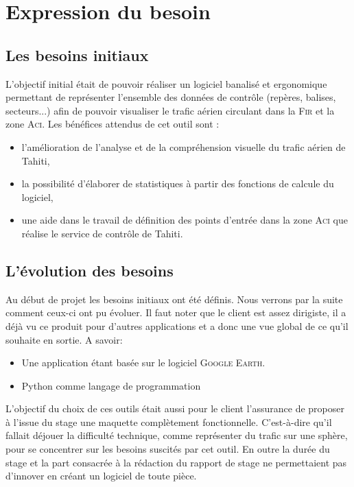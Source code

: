 
\section{Expression du besoin} 
    \subsection{Les besoins initiaux}
L’objectif initial était de pouvoir réaliser un logiciel banalisé et ergonomique permettant de
représenter l’ensemble des données de contrôle (repères, balises, secteurs...) afin de pouvoir
visualiser le trafic aérien circulant dans la \textsc{Fir} et la zone \textsc{Aci}.
Les bénéfices attendus de cet outil sont :
\begin{itemize}
\item l’amélioration de l’analyse et de la compréhension visuelle du trafic aérien de Tahiti,
\item la possibilité d’élaborer de statistiques à partir des fonctions de calcule du logiciel,
\item une aide dans le travail de définition des points d’entrée dans la zone \textsc{Aci} que réalise le
service de contrôle de Tahiti.
\end{itemize}\medskip

    \subsection{L’évolution des besoins}
Au début de projet les besoins initiaux ont été définis. Nous verrons par la suite comment ceux-ci ont pu évoluer. Il faut noter que le client est assez dirigiste, il a déjà vu ce produit pour d'autres applications et a donc une vue global de ce qu'il souhaite en sortie. A savoir:
\begin{itemize}
    \item Une application étant basée sur le logiciel \textsc{Google Earth}.
    \item Python comme langage de programmation
\end{itemize}\medskip
L’objectif du choix de ces outils était aussi pour le client l’assurance de proposer à l’issue du stage une maquette complètement fonctionnelle. C'est-à-dire qu’il fallait déjouer la difficulté technique, comme représenter du trafic sur une sphère, pour se concentrer sur les besoins suscités par cet outil. En outre la durée du stage et la part consacrée à la rédaction du rapport de stage ne permettaient pas d’innover en créant un logiciel de toute pièce.

